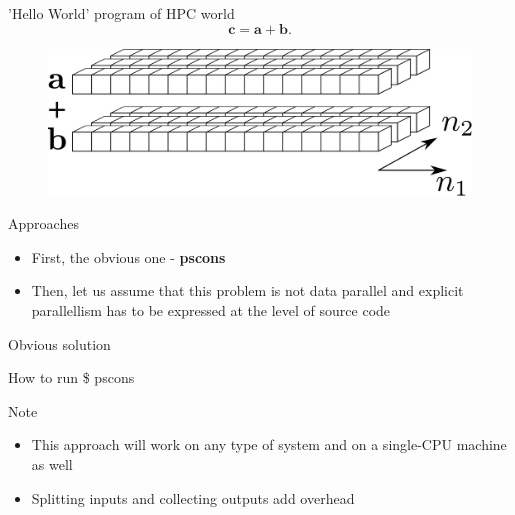 \begin{frame}
  \begin{block}{'Hello World' program of HPC world}
    \[ \mathbf{c} = \mathbf{a} + \mathbf{b}. \]
    \vspace{2mm}
  \end{block}
  \begin{figure}
  \includegraphics[scale=0.35]{Fig/abcfig.pdf}
  \end{figure}
  \begin{block}{Approaches}
    \begin{itemize}
      \vspace{-2mm}
      \item First, the obvious one - {\bf pscons}
      \item Then, let us assume that this problem is not data parallel and
explicit parallellism has to be expressed at the level of source code
    \end{itemize}
  \end{block}
\end{frame}

\begin{frame}
  \begin{block}{Obvious solution}
  \vspace{-5mm}
  
  \end{block}
  \begin{block}{How to run}
    \$ pscons
  \end{block}
  \begin{block}{Note}
    \vspace{-5mm}
    \begin{itemize}
      \item This approach will work on any type of system and on a
single-CPU machine as well
      \item Splitting inputs and collecting outputs add overhead
    \end{itemize}
  \end{block}
\end{frame}

